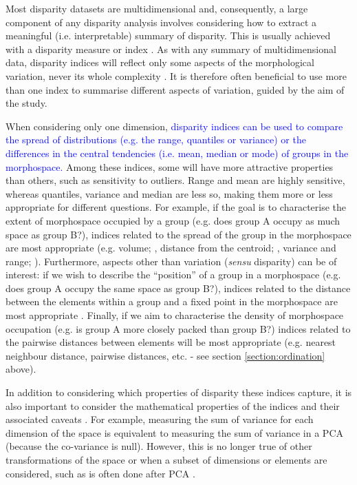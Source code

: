 \documentclass[12pt,letterpaper]{article}
\begin{document}
Most disparity datasets are multidimensional and, consequently, a large component of any disparity analysis involves considering how to extract a meaningful (i.e.
interpretable) summary of disparity.
This is usually achieved with a disparity measure or index \citep{Hopkins2017}.
As with any summary of multidimensional data, disparity indices will reflect only some aspects of the morphological variation, never its whole complexity \citep{GuillermeMOMS}.
It is therefore often beneficial to use more than one index to summarise different aspects of variation, guided by the aim of the study.

When considering only one dimension, \textcolor{blue}{disparity indices can be used to compare the spread of distributions (e.g. the range, quantiles or variance) or the differences in the central tendencies (i.e. mean, median or mode) of groups in the morphospace.}
Among these indices, some will have more attractive properties than others, such as sensitivity to outliers.
Range and mean are highly sensitive, whereas quantiles, variance and median are less so, making them more or less appropriate for different questions.
For example, if the goal is to characterise the extent of morphospace occupied by a group (e.g. does group A occupy as much space as group B?), indices related to the spread of the group in the morphospace are most appropriate (e.g.
volume; \citealt{Diaz2016}, distance from the centroid; \citealt{Hopkins2017, Finlay2015}, variance and range; \citealt{Brusatte2008}).
Furthermore, aspects other than variation (\textit{sensu} disparity) can be of interest: if we wish to describe the ``position'' of a group in a morphospace (e.g.
does group A occupy the same space as group B?), indices related to the distance between the elements within a group and a fixed point in the morphospace are most appropriate \citep{GuillermeMOMS}.
Finally, if we aim to characterise the density of morphospace occupation (e.g.
is group A more closely packed than group B?) indices related to the pairwise distances between elements will be most appropriate (e.g. nearest neighbour distance, pairwise distances, etc. \citealt{Close2015} - see section \ref{section:ordination} above).

In addition to considering which properties of disparity these indices capture, it is also important to consider the mathematical properties of the indices and their associated caveats \citep{Wills2001, Ciampaglio2001}.
For example, measuring the sum of variance for each dimension of the space is equivalent to measuring the sum of variance in a PCA (because the co-variance is null).
However, this is no longer true of other transformations of the space or when a subset of dimensions or elements are considered, such as is often done after PCA \citep{Legendre2012}.
\end{document}
